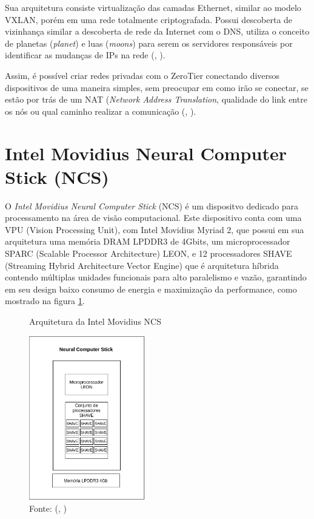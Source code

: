 \documentclass[]{politex}
\begin{document}
Sua arquitetura consiste virtualização das camadas Ethernet, similar ao modelo VXLAN, porém em uma rede totalmente criptografada. Possui descoberta de vizinhança similar a descoberta de rede da Internet com o DNS, utiliza o conceito de planetas (\textit{planet}) e luas (\textit{moons}) para serem os servidores responsáveis por identificar as mudanças de IPs na rede (, \citeyear{zerotier}).

Assim, é possível criar redes privadas com o ZeroTier conectando diversos dispositivos de uma maneira simples, sem preocupar em como irão se conectar, se estão por trás de um NAT (\textit{Network Address Translation}, qualidade do link entre os nós ou qual caminho realizar a comunicação (, \citeyear{zerotier}).

\section{Intel Movidius Neural Computer Stick (NCS)}
O \textit{Intel Movidius Neural Computer Stick} (NCS) é um dispositvo dedicado para processamento na área de visão computacional. Este dispositivo conta com uma VPU (Vision Processing Unit), com Intel Movidius Myriad 2, que possui em sua arquitetura uma memória DRAM LPDDR3 de 4Gbits, um microprocessador SPARC (Scalable Processor Architecture) LEON, e 12 processadores SHAVE (Streaming Hybrid Architecture Vector Engine) que é arquitetura híbrida contendo múltiplas unidades funcionais para alto paralelismo e vazão, garantindo em seu design baixo consumo de energia e maximização da performance, como mostrado na figura \ref{fig:intel_movidius}.

\begin{figure}[H]
    \centering
    \caption{Arquitetura da Intel Movidius NCS}
    \includegraphics[width=0.45\textwidth]{arquitetura_ncs}
    \caption*{Fonte: (, \citeyear{intel_movidius})}
    \label{fig:intel_movidius}
\end{figure}
\end{document}
